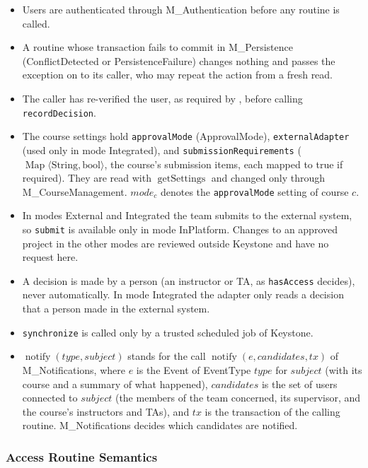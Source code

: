 \documentclass[12pt, titlepage]{article}
\newcommand{\descriptiveid}[1]{\texttt{\detokenize{#1}}}
\newcommand{\srsurl}{https://ayushpatel2026.github.io/Keystone/SRS/SRS.pdf}
\newcommand{\srsref}[1]{\href{\srsurl\#nameddest=#1}{\descriptiveid{#1}}}
\begin{document}
\begin{itemize}
    \item Users are authenticated through M\_Authentication before any routine is called.
    \item A routine whose transaction fails to commit in M\_Persistence (ConflictDetected or PersistenceFailure) changes nothing and passes the exception on to its caller, who may repeat the action from a fresh read.
    \item The caller has re-verified the user, as required by \srsref{FR_ReverifyUsers}, before calling \texttt{recordDecision}.
    \item The course settings hold \texttt{approvalMode} (ApprovalMode), \texttt{externalAdapter} (used only in mode Integrated), and \texttt{submissionRequirements} ($\operatorname{Map}\langle\text{String},\text{bool}\rangle$, the course's submission items, each mapped to true if required). They are read with $\operatorname{getSettings}$ and changed only through M\_CourseManagement. $\mathit{mode}_c$ denotes the \texttt{approvalMode} setting of course $c$.
    \item In modes External and Integrated the team submits to the external system, so \texttt{submit} is available only in mode InPlatform. Changes to an approved project in the other modes are reviewed outside Keystone and have no request here.
    \item A decision is made by a person (an instructor or TA, as \texttt{hasAccess} decides), never automatically. In mode Integrated the adapter only reads a decision that a person made in the external system.
    \item \texttt{synchronize} is called only by a trusted scheduled job of Keystone.
    \item $\operatorname{notify}(type,subject)$ stands for the call $\operatorname{notify}(e,\mathit{candidates},tx)$ of M\_Notifications, where $e$ is the Event of EventType $type$ for $subject$ (with its course and a summary of what happened), $\mathit{candidates}$ is the set of users connected to $subject$ (the members of the team concerned, its supervisor, and the course's instructors and TAs), and $tx$ is the transaction of the calling routine. M\_Notifications decides which candidates are notified.
\end{itemize}

\subsubsection{Access Routine Semantics}
\end{document}
